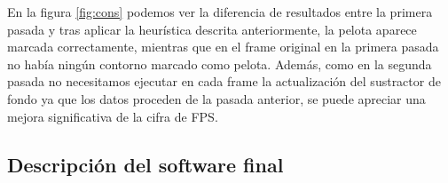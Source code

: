 En la figura \ref{fig:cons} podemos ver la diferencia de resultados entre la primera pasada y tras aplicar la heurística descrita anteriormente, la pelota aparece marcada correctamente, mientras que en el frame original en la primera pasada no había ningún contorno marcado como pelota. Además, como en la segunda pasada no necesitamos ejecutar en cada frame la actualización del sustractor de fondo ya que los datos proceden de la pasada anterior, se puede apreciar una mejora significativa de la cifra de FPS.

\subsection{Descripción del software final}


